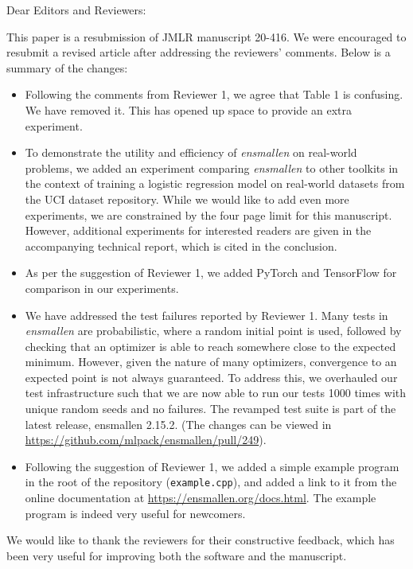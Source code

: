 \documentclass[twoside,11pt]{article}
\begin{document}
\noindent Dear Editors and Reviewers: \\

\medskip

\noindent This paper is a resubmission of JMLR manuscript 20-416.  We were
encouraged to resubmit a revised article after addressing the reviewers' comments.
Below is a summary of the changes:

\begin{itemize}
  \item Following the comments from Reviewer 1, we agree that Table 1 is
confusing. We have removed it.  This has opened up space to provide an extra experiment.

  \item To demonstrate the utility and efficiency of {\it ensmallen} on real-world
problems, we added an experiment comparing {\it ensmallen} to other toolkits in the context of training 
a logistic regression model on real-world datasets from the UCI dataset
repository.  While we would like to add even more experiments,
we are constrained by the four page limit for this manuscript.
However, additional experiments for interested readers are given
in the accompanying technical report, which is cited in the conclusion.

  \item As per the suggestion of Reviewer 1, we added PyTorch and TensorFlow
  for comparison in our experiments.

  \item We have addressed the test failures reported by Reviewer 1.
Many tests in {\it ensmallen} are probabilistic, where a random initial point is used,
followed by checking that an optimizer is able to reach somewhere
close to the expected minimum.  However, given the nature of many optimizers,
convergence to an expected point is not always guaranteed.
To address this, we overhauled our test infrastructure such that we are now able
to run our tests 1000 times with unique random seeds and no failures.
The revamped test suite is part of the latest release, ensmallen 2.15.2.
(The changes can be viewed in \url{https://github.com/mlpack/ensmallen/pull/249}).  

  \item Following the suggestion of Reviewer 1, we added a simple example program
in the root of the repository ({\tt example.cpp}), and added a link to it from the
online documentation at \url{https://ensmallen.org/docs.html}.
The example program is indeed very useful for newcomers.
\end{itemize}

\noindent We would like to thank the reviewers for their constructive feedback,
which has been very useful for improving both the software and the manuscript.
\end{document}

